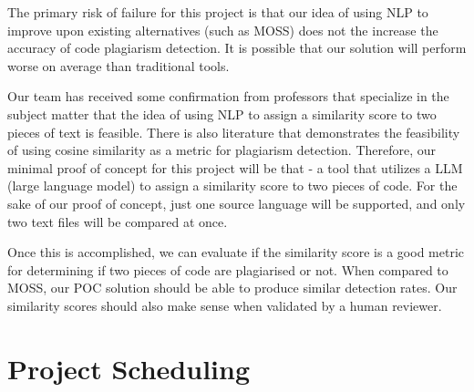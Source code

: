 \documentclass{article}
\begin{document}
The primary risk of failure for this project is that our idea of using NLP to improve upon existing alternatives (such as MOSS) does not the increase the accuracy of code plagiarism detection. It is possible that our solution will perform worse on average than traditional tools.

Our team has received some confirmation from professors that specialize in the subject matter that the idea of using NLP to assign a similarity score to two pieces of text is feasible. There is also literature that demonstrates the feasibility of using cosine similarity as a metric for plagiarism detection. Therefore, our minimal proof of concept for this project will be that - a tool that utilizes a LLM (large language model) to assign a similarity score to two pieces of code. For the sake of our proof of concept, just one source language will be supported, and only two text files will be compared at once.

Once this is accomplished, we can evaluate if the similarity score is a good metric for determining if two pieces of code are plagiarised or not. When compared to MOSS, our POC solution should be able to produce similar detection rates. Our similarity scores should also make sense when validated by a human reviewer.



\section{Project Scheduling}

\end{document}
